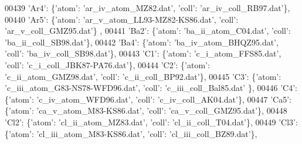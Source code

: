 \begin{DoxyCode}
00439                              \textcolor{stringliteral}{'Ar4'}: \{\textcolor{stringliteral}{'atom'}: \textcolor{stringliteral}{'ar\_iv\_atom\_MZ82.dat'}, \textcolor{stringliteral}{'coll'}: \textcolor{stringliteral}{'ar\_iv\_coll\_RB97.dat'}\},
00440                              \textcolor{stringliteral}{'Ar5'}: \{\textcolor{stringliteral}{'atom'}: \textcolor{stringliteral}{'ar\_v\_atom\_LL93-MZ82-KS86.dat'}, \textcolor{stringliteral}{'coll'}: \textcolor{stringliteral}{'ar\_v\_coll\_GMZ95.dat'}\}
      ,
00441                              \textcolor{stringliteral}{'Ba2'}: \{\textcolor{stringliteral}{'atom'}: \textcolor{stringliteral}{'ba\_ii\_atom\_C04.dat'}, \textcolor{stringliteral}{'coll'}: \textcolor{stringliteral}{'ba\_ii\_coll\_SB98.dat'}\},
00442                              \textcolor{stringliteral}{'Ba4'}: \{\textcolor{stringliteral}{'atom'}: \textcolor{stringliteral}{'ba\_iv\_atom\_BHQZ95.dat'}, \textcolor{stringliteral}{'coll'}: \textcolor{stringliteral}{'ba\_iv\_coll\_SB98.dat'}\},
00443                              \textcolor{stringliteral}{'C1'}: \{\textcolor{stringliteral}{'atom'}: \textcolor{stringliteral}{'c\_i\_atom\_FFS85.dat'}, \textcolor{stringliteral}{'coll'}: \textcolor{stringliteral}{'c\_i\_coll\_JBK87-PA76.dat'}\},
00444                              \textcolor{stringliteral}{'C2'}: \{\textcolor{stringliteral}{'atom'}: \textcolor{stringliteral}{'c\_ii\_atom\_GMZ98.dat'}, \textcolor{stringliteral}{'coll'}: \textcolor{stringliteral}{'c\_ii\_coll\_BP92.dat'}\},
00445                              \textcolor{stringliteral}{'C3'}: \{\textcolor{stringliteral}{'atom'}: \textcolor{stringliteral}{'c\_iii\_atom\_G83-NS78-WFD96.dat'}, \textcolor{stringliteral}{'coll'}: \textcolor{stringliteral}{'c\_iii\_coll\_Bal85.dat'}
      \},
00446                              \textcolor{stringliteral}{'C4'}: \{\textcolor{stringliteral}{'atom'}: \textcolor{stringliteral}{'c\_iv\_atom\_WFD96.dat'}, \textcolor{stringliteral}{'coll'}: \textcolor{stringliteral}{'c\_iv\_coll\_AK04.dat'}\},
00447                              \textcolor{stringliteral}{'Ca5'}: \{\textcolor{stringliteral}{'atom'}: \textcolor{stringliteral}{'ca\_v\_atom\_M83-KS86.dat'}, \textcolor{stringliteral}{'coll'}: \textcolor{stringliteral}{'ca\_v\_coll\_GMZ95.dat'}\},
00448                              \textcolor{stringliteral}{'Cl2'}: \{\textcolor{stringliteral}{'atom'}: \textcolor{stringliteral}{'cl\_ii\_atom\_MZ83.dat'}, \textcolor{stringliteral}{'coll'}: \textcolor{stringliteral}{'cl\_ii\_coll\_T04.dat'}\},
00449                              \textcolor{stringliteral}{'Cl3'}: \{\textcolor{stringliteral}{'atom'}: \textcolor{stringliteral}{'cl\_iii\_atom\_M83-KS86.dat'}, \textcolor{stringliteral}{'coll'}: \textcolor{stringliteral}{'cl\_iii\_coll\_BZ89.dat'}\},

\end{DoxyCode}
